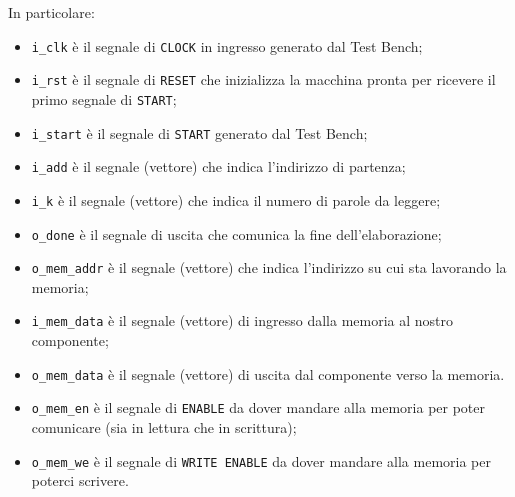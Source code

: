 In particolare:
\begin{itemize}
	\item \lstinline[columns=fixed]{i_clk} è il segnale di \lstinline[columns=fixed]{CLOCK} in ingresso generato dal Test Bench;
		
	\item \lstinline[columns=fixed]{i_rst} è il segnale di \lstinline[columns=fixed]{RESET} che inizializza la macchina pronta per ricevere il primo segnale di \lstinline[columns=fixed]{START};

 	\item \lstinline[columns=fixed]{i_start} è il segnale di \lstinline[columns=fixed]{START} generato dal Test Bench;
	
	\item \lstinline[columns=fixed]{i_add} è il segnale (vettore) che indica l'indirizzo di partenza;
	
	\item \lstinline[columns=fixed]{i_k} è il segnale (vettore) che indica il numero di parole da leggere;
	
	\item \lstinline[columns=fixed]{o_done} è il segnale di uscita che comunica la fine dell'elaborazione;
	
	\item \lstinline[columns=fixed]{o_mem_addr} è il segnale (vettore) che indica l'indirizzo su cui sta lavorando la memoria;

 	\item \lstinline[columns=fixed]{i_mem_data} è il segnale (vettore) di ingresso dalla memoria al nostro componente;

  	\item \lstinline[columns=fixed]{o_mem_data} è il segnale (vettore) di uscita dal componente verso la memoria.

  	\item \lstinline[columns=fixed]{o_mem_en} è il segnale di \lstinline[columns=fixed]{ENABLE} da dover mandare alla memoria per poter comunicare (sia in lettura che in scrittura);
	
	\item \lstinline[columns=fixed]{o_mem_we} è il segnale di \lstinline[columns=fixed]{WRITE ENABLE} da dover mandare alla memoria per poterci scrivere.
\end{itemize}
